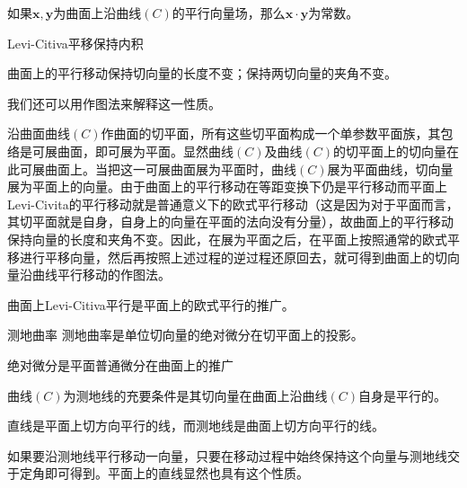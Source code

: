 \documentclass[lang = cn, scheme = chinese, thmcnt = section]{elegantbook}
\newcommand{\bs}{\boldsymbol}          %
\begin{document}
\begin{theorem}
	如果$\bs{x},\bs{y}$为曲面上沿曲线$(C)$的平行向量场，那么$\bs{x}\cdot\bs{y}$为常数。
\end{theorem}

\begin{corollary}
	Levi-Citiva平移保持内积
\end{corollary}

\begin{corollary}
	曲面上的平行移动保持切向量的长度不变；保持两切向量的夹角不变。
\end{corollary}

我们还可以用作图法来解释这一性质。

沿曲面曲线$(C)$作曲面的切平面，所有这些切平面构成一个单参数平面族，其包络是可展曲面，即可展为平面。显然曲线$(C)$及曲线$(C)$的切平面上的切向量在此可展曲面上。当把这一可展曲面展为平面时，曲线$(C)$展为平面曲线，切向量展为平面上的向量。由于曲面上的平行移动在等距变换下仍是平行移动而平面上Levi-Civita的平行移动就是普通意义下的欧式平行移动（这是因为对于平面而言，其切平面就是自身，自身上的向量在平面的法向没有分量），故曲面上的平行移动保持向量的长度和夹角不变。因此，在展为平面之后，在平面上按照通常的欧式平移进行平移向量，然后再按照上述过程的逆过程还原回去，就可得到曲面上的切向量沿曲线平行移动的作图法。

\begin{remark}
	曲面上Levi-Citiva平行是平面上的欧式平行的推广。
\end{remark}

\begin{definition}{测地曲率}
	测地曲率是单位切向量的绝对微分在切平面上的投影。
\end{definition}

\begin{remark}
	绝对微分是平面普通微分在曲面上的推广
\end{remark}

\begin{theorem}
	曲线$(C)$为测地线的充要条件是其切向量在曲面上沿曲线$(C)$自身是平行的。
\end{theorem}

\begin{remark}
	直线是平面上切方向平行的线，而测地线是曲面上切方向平行的线。
\end{remark}

\begin{remark}
	如果要沿测地线平行移动一向量，只要在移动过程中始终保持这个向量与测地线交于定角即可得到。平面上的直线显然也具有这个性质。
\end{remark}
\end{document}
